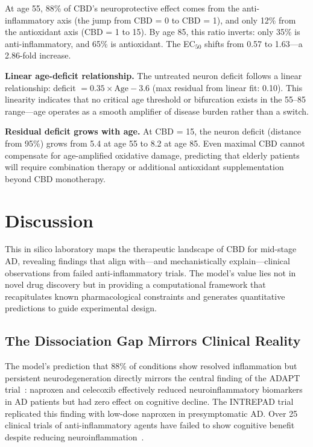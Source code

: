 \documentclass[10pt,letterpaper]{article}
\begin{document}
At age 55, 88\% of CBD's neuroprotective effect comes from the anti-inflammatory axis (the jump from CBD = 0 to CBD = 1), and only 12\% from the antioxidant axis (CBD = 1 to 15). By age 85, this ratio inverts: only 35\% is anti-inflammatory, and 65\% is antioxidant. The EC$_{50}$ shifts from 0.57 to 1.63---a 2.86-fold increase.

\vspace{3pt}
\noindent\textbf{Linear age-deficit relationship.} The untreated neuron deficit follows a linear relationship: deficit $= 0.35 \times \text{Age} - 3.6$ (max residual from linear fit: 0.10). This linearity indicates that no critical age threshold or bifurcation exists in the 55--85 range---age operates as a smooth amplifier of disease burden rather than a switch.

\vspace{3pt}
\noindent\textbf{Residual deficit grows with age.} At CBD = 15, the neuron deficit (distance from 95\%) grows from 5.4 at age 55 to 8.2 at age 85. Even maximal CBD cannot compensate for age-amplified oxidative damage, predicting that elderly patients will require combination therapy or additional antioxidant supplementation beyond CBD monotherapy.

\section{Discussion}
\label{sec:discussion}

This in silico laboratory maps the therapeutic landscape of CBD for mid-stage AD, revealing findings that align with---and mechanistically explain---clinical observations from failed anti-inflammatory trials. The model's value lies not in novel drug discovery but in providing a computational framework that recapitulates known pharmacological constraints and generates quantitative predictions to guide experimental design.

\subsection{The Dissociation Gap Mirrors Clinical Reality}

The model's prediction that 88\% of conditions show resolved inflammation but persistent neurodegeneration directly mirrors the central finding of the ADAPT trial~\cite{adapt2007}: naproxen and celecoxib effectively reduced neuroinflammatory biomarkers in AD patients but had zero effect on cognitive decline. The INTREPAD trial~\cite{intrepad2019} replicated this finding with low-dose naproxen in presymptomatic AD. Over 25 clinical trials of anti-inflammatory agents have failed to show cognitive benefit despite reducing neuroinflammation~\cite{imbimbo2010}.
\end{document}
